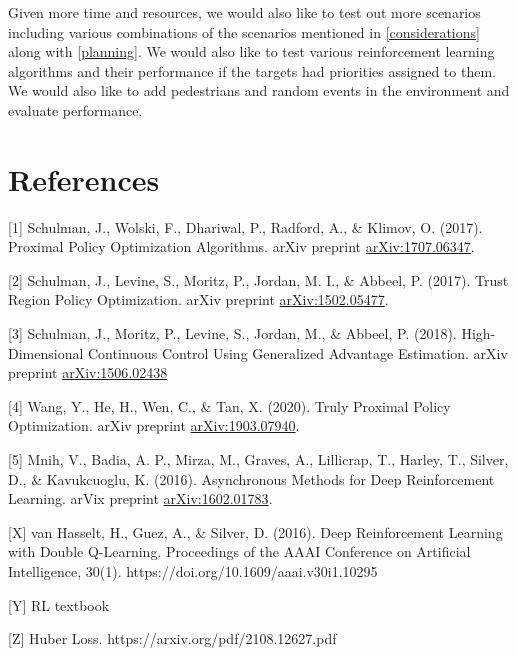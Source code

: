 \documentclass{article}
\begin{document}
    Given more time and resources, we would also like to test out more scenarios including various combinations of the scenarios mentioned in \ref{considerations} along with \ref{planning}. We would also like to test various reinforcement learning algorithms and their performance if the targets had priorities assigned to them. We would also like to add pedestrians and random events in the environment and evaluate performance.
    
    \section*{References}
    
    
    [1] Schulman, J., Wolski, F., Dhariwal, P., Radford, A., \& Klimov, O. (2017). Proximal Policy Optimization Algorithms. arXiv preprint \href{https://arxiv.org/abs/1707.06347}{arXiv:1707.06347}.
    
    [2] Schulman, J., Levine, S., Moritz, P., Jordan, M. I., \& Abbeel, P. (2017). Trust Region Policy Optimization. arXiv preprint \href{https://arxiv.org/abs/1502.05477}{arXiv:1502.05477}.
    
    [3] Schulman, J., Moritz, P., Levine, S., Jordan, M., \& Abbeel, P. (2018). High-Dimensional Continuous Control Using Generalized Advantage Estimation. arXiv preprint \href{https://arxiv.org/abs/1506.02438}{arXiv:1506.02438}
    
    [4] Wang, Y., He, H., Wen, C., \& Tan, X. (2020). Truly Proximal Policy Optimization. arXiv preprint \href{https://arxiv.org/abs/1903.07940}{arXiv:1903.07940}.
    
    [5] Mnih, V., Badia, A. P., Mirza, M., Graves, A., Lillicrap, T., Harley, T., Silver, D., & Kavukcuoglu, K. (2016). Asynchronous Methods for Deep Reinforcement Learning. arVix preprint \href{https://arxiv.org/abs/1602.01783}{arXiv:1602.01783}.

    [X] van Hasselt, H., Guez, A., & Silver, D. (2016). Deep Reinforcement Learning with Double Q-Learning. Proceedings of the AAAI Conference on Artificial Intelligence, 30(1). https://doi.org/10.1609/aaai.v30i1.10295

    [Y] RL textbook

    [Z] Huber Loss. https://arxiv.org/pdf/2108.12627.pdf 

    
\end{document}
